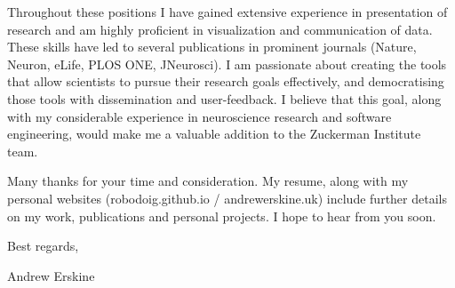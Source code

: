 \documentclass[11pt, letterpaper]{awesome-cv}
\begin{document}
Throughout these positions I have gained extensive experience in presentation of research and am highly proficient in visualization and communication of data. These skills have led to several publications in prominent journals (Nature, Neuron, eLife, PLOS ONE, JNeurosci). I am passionate about creating the tools that allow scientists to pursue their research goals effectively, and democratising those tools with dissemination and user-feedback. I believe that this goal, along with my considerable experience in neuroscience research and software engineering, would make me a valuable addition to the Zuckerman Institute team.  

Many thanks for your time and consideration. My resume, along with my personal websites (robodoig.github.io / andrewerskine.uk) include further details on my work, publications and personal projects. I hope to hear from you soon.

Best regards,

Andrew Erskine

\end{document}
